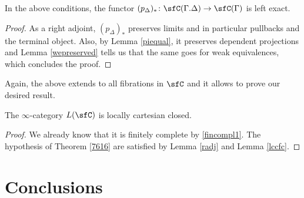 \begin{lem}\label{lccfc}
  In the above conditions, the functor
  $(p_\Delta)_*\colon\sfC(\Gamma.\Delta)\rightarrow\sfC(\Gamma)$ is left exact.
\end{lem}
\begin{proof}
  As a right adjoint, $(p_\Delta)_*$ preserves limits and in particular
  pullbacks and the terminal object. Also, by Lemma \ref{piequal}, it preserves
  dependent projections and Lemma \ref{wepreserved} tells us that the same
  goes for weak equivalences, which concludes the proof.
\end{proof}

Again, the above extends to all fibrations in $\sfC$ and it allows to prove our
desired result.

\begin{thm}\label{finalthm}
  The $\infty$-category $L(\sfC)$ is locally cartesian closed.
\end{thm}
\begin{proof}
  We already know that it is finitely complete by \ref{fincompl1}. The
  hypothesis of Theorem \ref{7616} are satisfied by Lemma \ref{radj} and Lemma
  \ref{lccfc}.
\end{proof}

\section{Conclusions}
